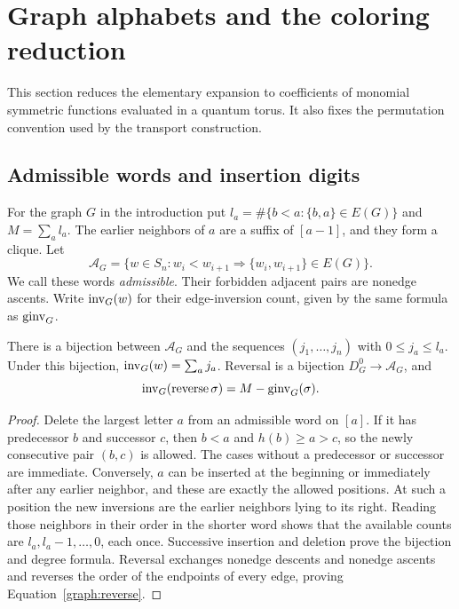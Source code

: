 \section{Graph alphabets and the coloring reduction}
\label{graph:section}

This section reduces the elementary expansion to coefficients of
monomial symmetric functions evaluated in a quantum torus. It also
fixes the permutation convention used by the transport construction.

\subsection{Admissible words and insertion digits}

For the graph $G$ in the introduction put
$l_a=\#\{b<a:\{b,a\}\in E(G)\}$ and $M=\sum_a l_a$.
The earlier neighbors of $a$ are a suffix of $[a-1]$, and they form a
clique. Let
\[
 \mathcal A_G=\{w\in S_n:
    w_i<w_{i+1}\Longrightarrow\{w_i,w_{i+1}\}\in E(G)\}.
\]
We call these words \emph{admissible}. Their forbidden adjacent pairs
are nonedge ascents. Write $\operatorname{inv}_G(w)$ for their edge-inversion count,
given by the same formula as $\operatorname{ginv}_G$.

\begin{lemma}
\label{graph:digits}
There is a bijection between $\mathcal A_G$ and the sequences
$(j_1,\ldots,j_n)$ with $0\le j_a\le l_a$. Under this bijection,
$\operatorname{inv}_G(w)=\sum_a j_a$. Reversal is a bijection
$D_G^0\to\mathcal A_G$, and
\begin{equation}
 \operatorname{inv}_G(\operatorname{reverse}\sigma)=M-\operatorname{ginv}_G(\sigma).
 \label{graph:reverse}
\end{equation}
\end{lemma}

\begin{proof}
Delete the largest letter $a$ from an admissible word on $[a]$.
If it has predecessor $b$ and successor $c$, then $b<a$ and
$h(b)\ge a>c$, so the newly consecutive pair $(b,c)$ is allowed.
The cases without a predecessor or successor are immediate. Conversely,
$a$ can be inserted at the beginning or immediately after any earlier
neighbor, and these are exactly the allowed positions. At such a
position the new inversions are the earlier neighbors lying to its
right. Reading those neighbors in their order in the shorter word
shows that the available counts are $l_a,l_a-1,\ldots,0$, each once.
Successive insertion and deletion prove the bijection and degree
formula. Reversal exchanges nonedge descents and nonedge ascents and
reverses the order of the endpoints of every edge, proving
Equation~\eqref{graph:reverse}.
\end{proof}

